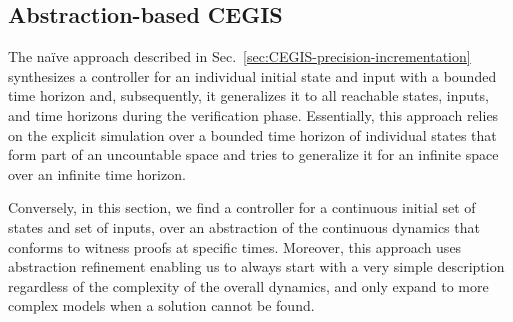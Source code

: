 \documentclass[runningheads,a4paper]{llncs}
\begin{document}
\subsection{Abstraction-based CEGIS}
\label{sec:CEGIS-abstraction-refinement}



  The na\"ive approach described in Sec.~\ref{sec:CEGIS-precision-incrementation}
  synthesizes a controller for an individual initial state
and input with a bounded time horizon and, subsequently, it generalizes it to all reachable states,
inputs, and time horizons during the verification phase.
Essentially, this approach relies on the explicit
simulation over a bounded time horizon of individual states that form
part of an uncountable space and tries to generalize it for an
infinite space over an infinite time horizon.





Conversely, in this section, 
we  find a controller for a continuous initial set of states and set of inputs, 
  over an abstraction of the continuous dynamics that conforms to
  witness proofs at specific times. %
  Moreover, this approach uses abstraction refinement enabling us to 
  always start with a very simple description regardless of the complexity of the overall
dynamics, and only expand to more complex models when a solution
cannot be found.
\end{document}
